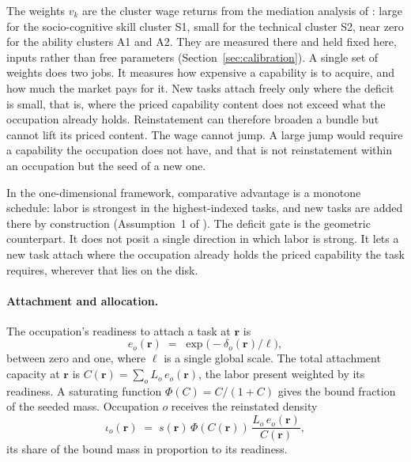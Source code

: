 \documentclass[12pt, a4paper]{article}
\begin{document}
The weights $v_k$ are the cluster wage returns from the mediation
analysis of \textcite{storck2026geometry}: large for the
socio-cognitive skill cluster S1, small for the technical cluster S2,
near zero for the ability clusters A1 and A2. They are measured there
and held fixed here, inputs rather than free parameters
(Section~\ref{sec:calibration}). A single set of weights
does two jobs. It measures how expensive a capability is to acquire,
and how much the market pays for it. New tasks attach freely only where
the deficit is small, that is, where the priced capability content does
not exceed what the occupation already holds. Reinstatement can
therefore broaden a bundle but cannot lift its priced content. The wage
cannot jump. A large jump would require a capability the occupation does
not have, and that is not reinstatement within an occupation but the
seed of a new one.

In the one-dimensional framework, comparative advantage is a monotone
schedule: labor is strongest in the highest-indexed tasks, and new
tasks are added there by construction (Assumption~1 of
\textcite{acemoglu2018race}). The deficit gate is the geometric
counterpart. It does not posit a single direction in which labor is
strong. It lets a new task attach where the occupation already holds
the priced capability the task requires, wherever that lies on the
disk.

\paragraph{Attachment and allocation.}
The occupation's readiness to attach a task at $\mathbf{r}$ is
\begin{equation}
  e_o(\mathbf{r}) \;=\; \exp\!\bigl(-\delta_o(\mathbf{r})/\ell\bigr),
  \label{eq:readiness}
\end{equation}
between zero and one, where $\ell$ is a single global scale. The total
attachment capacity at $\mathbf{r}$ is $C(\mathbf{r}) = \sum_o L_o\,
e_o(\mathbf{r})$, the labor present weighted by its readiness. A
saturating function $\Phi(C) = C/(1 + C)$ gives the bound fraction of
the seeded mass. Occupation $o$ receives the reinstated density
\begin{equation}
  \iota_o(\mathbf{r})
  \;=\;
  s(\mathbf{r})\,\Phi(C(\mathbf{r}))\,
  \frac{L_o\, e_o(\mathbf{r})}{C(\mathbf{r})},
  \label{eq:reinstated}
\end{equation}
its share of the bound mass in proportion to its readiness.
\end{document}
